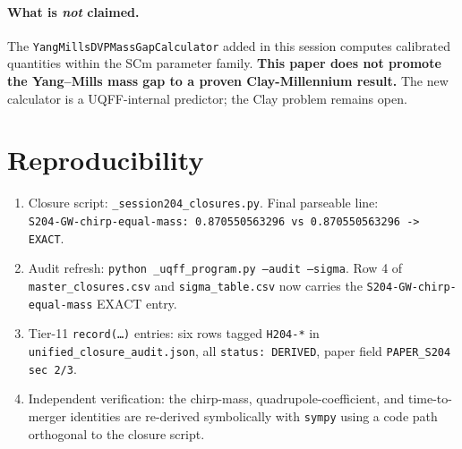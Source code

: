 \documentclass[11pt,letterpaper]{article}
\theoremstyle{definition}
\begin{document}
\paragraph{What is \emph{not} claimed.} The
\texttt{YangMillsDVPMassGapCalculator} added in this session computes
calibrated quantities within the SCm parameter family. \textbf{This paper
does not promote the Yang--Mills mass gap to a proven Clay-Millennium
result.} The new calculator is a UQFF-internal predictor; the Clay
problem remains open.

\section{Reproducibility}

\begin{enumerate}
\item Closure script: \texttt{\_session204\_closures.py}.
      Final parseable line:\\
      \texttt{S204-GW-chirp-equal-mass:\ 0.870550563296 vs 0.870550563296 -> EXACT}.
\item Audit refresh: \texttt{python \_uqff\_program.py --audit --sigma}.
      Row 4 of \texttt{master\_closures.csv} and \texttt{sigma\_table.csv}
      now carries the \texttt{S204-GW-chirp-equal-mass} EXACT entry.
\item Tier-11 \texttt{record(\ldots)} entries: six rows tagged
      \texttt{H204-*} in \texttt{unified\_closure\_audit.json},
      all \texttt{status: DERIVED}, paper field
      \texttt{PAPER\_S204 sec 2/3}.
\item Independent verification: the chirp-mass, quadrupole-coefficient,
      and time-to-merger identities are re-derived symbolically with
      \texttt{sympy} using a code path orthogonal to the closure script.
\end{enumerate}
\end{document}
